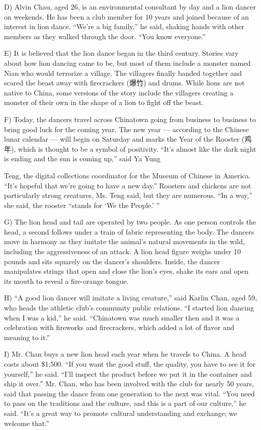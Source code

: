 \documentclass[UTF8,11pt]{ctexart}
\begin{document}
D) Alvin Chau, aged 26, is an environmental consultant by day and a lion dancer on weekends. He has been a club member for 10 years and joined because of an interest in lion dance. “We’re a big family,” he said, shaking hands with other members as they walked through the door. “You know everyone.”


E) It is believed that the lion dance began in the third century. Stories vary about how lion dancing came to be, but most of them include a monster named Nian who would terrorize a village. The villagers finally banded together and scared the beast away with firecrackers (爆竹) and drums. While lions are not native to China, some versions of the story include the villagers creating a monster of their own in the shape of a lion to fight off the beast.


F) Today, the dancers travel across Chinatown going from business to business to bring good luck for the coming year. The new year — according to the Chinese lunar calendar — will begin on Saturday and marks the Year of the Rooster (鸡年), which is thought to be a symbol of positivity. “It’s almost like the dark night is ending and the sun is coming up,” said Ya Yung


Teng, the digital collections coordinator for the Museum of Chinese in America. “It’s hopeful that we’re going to have a new day.” Roosters and chickens are not particularly strong creatures, Ms. Teng said, but they are numerous. “In a way,” she said, the rooster “stands for ‘We the People.’ ”


G) The lion head and tail are operated by two people. As one person controls the head, a second follows under a train of fabric representing the body. The dancers move in harmony as they imitate the animal’s natural movements in the wild, including the aggressiveness of an attack. A lion head figure weighs under 10 pounds and sits squarely on the dancer’s shoulders. Inside, the dancer manipulates strings that open and close the lion’s eyes, shake its ears and open its mouth to reveal a fire-orange tongue.


H) “A good lion dancer will imitate a living creature,” said Karlin Chan, aged 59, who heads the athletic club’s community public relations. “I started lion dancing when I was a kid,” he said. “Chinatown was much smaller then and it was a celebration with fireworks and firecrackers, which added a lot of flavor and meaning to it.”


I) Mr. Chan buys a new lion head each year when he travels to China. A head costs about \$1,500. “If you want the good stuff, the quality, you have to see it for yourself,” he said. “I’ll inspect the product before we put it in the container and ship it over.” Mr. Chan, who has been involved with the club for nearly 50 years, said that passing the dance from one generation to the next was vital. “You need to pass on the traditions and the culture, and this is a part of our culture,” he said. “It’s a great way to promote cultural understanding and exchange; we welcome that.”
\end{document}
